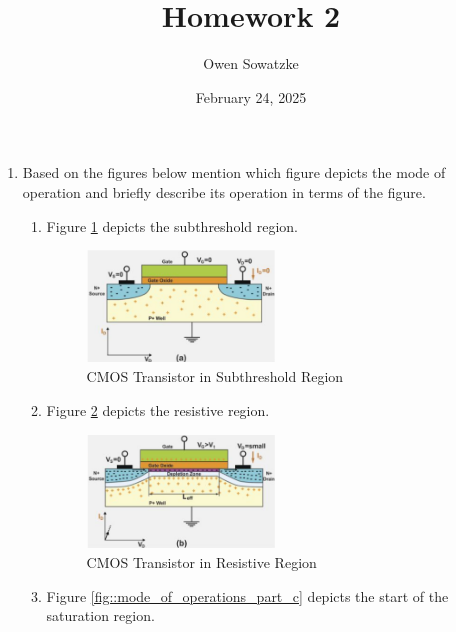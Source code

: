 \documentclass[fleqn]{article}
\title{Homework 2}
\author{Owen Sowatzke}
\date{February 24, 2025}
\newcommand{\zerodisplayskip}{
	\setlength{\abovedisplayskip}{0pt}%
	\setlength{\belowdisplayskip}{0pt}%
	\setlength{\abovedisplayshortskip}{0pt}%
	\setlength{\belowdisplayshortskip}{0pt}%
	\setlength{\mathindent}{0pt}}
\begin{document}
	\offinterlineskip
	\setlength{\lineskip}{12pt}
	\zerodisplayskip
	\maketitle
	
	\begin{enumerate}
		\item Based on the figures below mention which figure depicts the mode of operation and briefly describe its operation in terms of the figure.
		
		\begin{enumerate}
		
			\item Figure \ref{fig::mode_of_operations_part_a} depicts the subthreshold region.
			
			\begin{figure}[H]				
				\centerline{\includegraphics[width=0.5\textwidth]{mode_of_operations_part_a.png}}
				\caption{CMOS Transistor in Subthreshold Region}
				\label{fig::mode_of_operations_part_a}
			\end{figure}
		
			\item Figure \ref{fig::mode_of_operations_part_b} depicts the resistive region.
			
			\begin{figure}[H]				
				\centerline{\includegraphics[width=0.5\textwidth]{mode_of_operations_part_b.png}}
				\caption{CMOS Transistor in Resistive Region}
				\label{fig::mode_of_operations_part_b}
			\end{figure}
			
			\item Figure \ref{fig::mode_of_operations_part_c} depicts the start of the saturation region.
			

\end{enumerate}
\end{enumerate}
\end{document}
